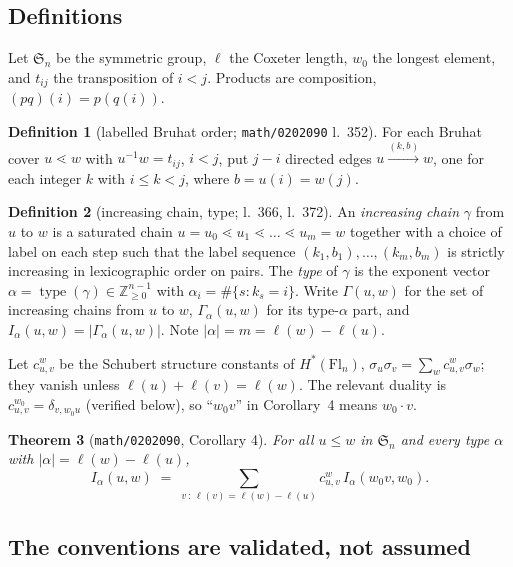 \documentclass[11pt]{article}
\theoremstyle{plain}
\newtheorem{theorem}{Theorem}
\theoremstyle{definition}
\newtheorem{definition}[theorem]{Definition}
\newcommand{\Gam}{\Gamma}
\newcommand{\wo}{w_0}
\newcommand{\Sn}{\mathfrak{S}_n}
\DeclareMathOperator{\type}{type}
\begin{document}
\subsection{Definitions}

Let $\Sn$ be the symmetric group, $\ell$ the Coxeter length, $\wo$ the longest
element, and $t_{ij}$ the transposition of $i<j$.  Products are composition,
$(pq)(i)=p(q(i))$.

\begin{definition}[labelled Bruhat order; \texttt{math/0202090} l.~352]
For each Bruhat cover $u\lessdot w$ with $u^{-1}w=t_{ij}$, $i<j$, put $j-i$
directed edges $u\xrightarrow{(k,b)}w$, one for each integer $k$ with
$i\le k<j$, where $b=u(i)=w(j)$.
\end{definition}

\begin{definition}[increasing chain, type; l.~366, l.~372]
An \emph{increasing chain} $\gamma$ from $u$ to $w$ is a saturated chain
$u=u_0\lessdot u_1\lessdot\dots\lessdot u_m=w$ together with a choice of label on
each step such that the label sequence $(k_1,b_1),\dots,(k_m,b_m)$ is strictly
increasing in lexicographic order on pairs.  The \emph{type} of $\gamma$ is the
exponent vector $\alpha=\type(\gamma)\in\mathbb{Z}_{\ge0}^{n-1}$ with
$\alpha_i=\#\{s: k_s=i\}$.  Write $\Gam(u,w)$ for the set of increasing chains
from $u$ to $w$, $\Gam_\alpha(u,w)$ for its type-$\alpha$ part, and
$I_\alpha(u,w)=|\Gam_\alpha(u,w)|$.  Note $|\alpha|=m=\ell(w)-\ell(u)$.
\end{definition}

Let $c^w_{u,v}$ be the Schubert structure constants of $H^*(\mathrm{Fl}_n)$,
$\sigma_u\sigma_v=\sum_w c^w_{u,v}\sigma_w$; they vanish unless
$\ell(u)+\ell(v)=\ell(w)$.  The relevant duality is
$c^{\wo}_{u,v}=\delta_{v,\wo u}$ (verified below), so ``$\wo v$'' in Corollary~4
means $\wo\cdot v$.

\begin{theorem}[\texttt{math/0202090}, Corollary 4]\label{thm:cor4}
For all $u\le w$ in $\Sn$ and every type $\alpha$ with $|\alpha|=\ell(w)-\ell(u)$,
\[
  I_\alpha(u,w)\;=\;\sum_{v\,:\,\ell(v)=\ell(w)-\ell(u)} c^w_{u,v}\,
  I_\alpha(\wo v,\wo).
\]
\end{theorem}

\subsection{The conventions are validated, not assumed}
\end{document}
